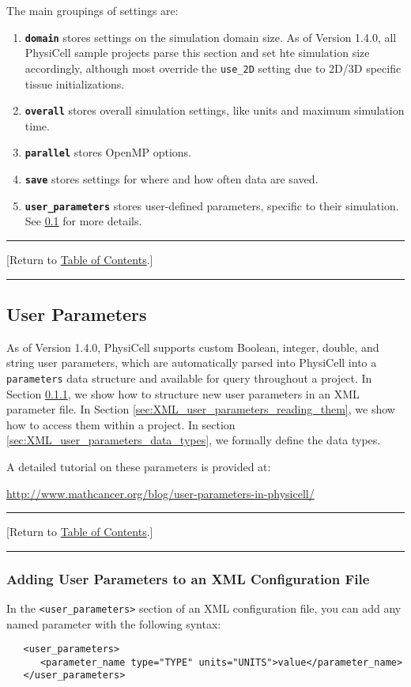 \documentclass[12pt]{article}
\renewcommand{\v}{\verb}
\newcommand{\smallcode}[1]{\textbf{\texttt{#1}}}
\newcommand{\TOClink}{\begin{center}\hrule\vskip-10pt\phantom{.}\hfill[Return to \hyperlink{TOC}{Table of Contents}.]\hfill\phantom{.}\vskip3pt\hrule\end{center}}
\begin{document}
The main groupings of settings are: 
\begin{enumerate}
\item
\smallcode{domain} stores settings on the simulation domain size. As of 
Version 1.4.0, all PhysiCell sample projects parse this section and set hte 
simulation size accordingly, although most override the \v|use_2D| setting 
due to 2D/3D specific tissue initializations. 

\item
\smallcode{overall} stores overall simulation settings, like units 
and maximum simulation time. 

\item 
\smallcode{parallel} stores OpenMP options. 

\item 
\smallcode{save} stores settings for where and how often data are saved. 

\item 
\smallcode{user\_parameters} stores user-defined parameters, specific to their 
simulation. See \ref{sec:XML_user_parameters} for more details. 
\end{enumerate}

\TOClink 

\subsection{User Parameters}
\label{sec:XML_user_parameters}
As of Version 1.4.0, PhysiCell supports custom Boolean, integer, double, and string user parameters, which are automatically parsed into PhysiCell into a \v|parameters| data structure and available for query throughout a project. In Section \ref{sec:XML_user_parameters_XML_structure}, we show how to structure new 
user parameters in an XML parameter file. In Section \ref{sec:XML_user_parameters_reading_them}, 
we show how to access them within a project. In section \ref{sec:XML_user_parameters_data_types}, 
we formally define the data types. 

A detailed tutorial on these parameters is provided at: 
\begin{center}
\href{http://www.mathcancer.org/blog/user-parameters-in-physicell/}{http://www.mathcancer.org/blog/user-parameters-in-physicell/}
\end{center}

\TOClink

\subsubsection{Adding User Parameters to an XML Configuration File}
\label{sec:XML_user_parameters_XML_structure}
In the \v|<user_parameters>| section of an XML configuration file, you can 
add any named parameter with the following syntax: 
\begin{verbatim}
   <user_parameters>
      <parameter_name type="TYPE" units="UNITS">value</parameter_name>
   </user_parameters>
\end{verbatim}
\end{document}

